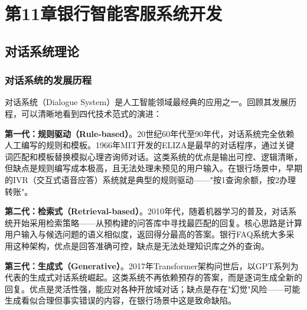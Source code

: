 
\chapter{第11章\quad 银行智能客服系统开发}


\section{对话系统理论}

\subsection{对话系统的发展历程}

对话系统（Dialogue System）是人工智能领域最经典的应用之一。回顾其发展历程，可以清晰地看到四代技术范式的演进：

\textbf{第一代：规则驱动（Rule-based）}。20世纪60年代至90年代，对话系统完全依赖人工编写的规则和模板。1966年MIT开发的ELIZA是最早的对话程序，通过关键词匹配和模板替换模拟心理咨询师对话。这类系统的优点是输出可控、逻辑清晰，但缺点是规则编写成本极高，且无法处理未预见的用户输入。在银行场景中，早期的IVR（交互式语音应答）系统就是典型的规则驱动——"按1查询余额，按2办理转账"。

\textbf{第二代：检索式（Retrieval-based）}。2010年代，随着机器学习的普及，对话系统开始采用检索策略——从预构建的问答库中寻找最匹配的回复。核心思路是计算用户输入与候选问题的语义相似度，返回得分最高的答案。银行FAQ系统大多采用这种架构，优点是回答准确可控，缺点是无法处理知识库之外的查询。

\textbf{第三代：生成式（Generative）}。2017年Transformer架构问世后，以GPT系列为代表的生成式对话系统崛起。这类系统不再依赖预存的答案，而是逐词生成全新的回复。优点是灵活性强，能应对各种开放域对话；缺点是存在"幻觉"风险——可能生成看似合理但事实错误的内容，在银行场景中这是致命缺陷。


